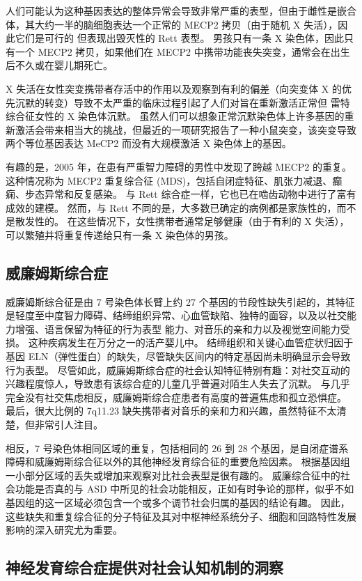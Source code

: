 人们可能认为这种基因表达的整体异常会导致非常严重的表型，但由于雌性是嵌合体，其大约一半的脑细胞表达一个正常的 MECP2 拷贝（由于随机 X 失活），因此它们是可行的 但表现出毁灭性的 Rett 表型。 男孩只有一条 X 染色体，因此只有一个 MECP2 拷贝，如果他们在 MECP2 中携带功能丧失突变，通常会在出生后不久或在婴儿期死亡。

X 失活在女性突变携带者存活中的作用以及观察到有利的偏差（向突变体 X 的优先沉默的转变）导致不太严重的临床过程引起了人们对旨在重新激活正常但 雷特综合征女性的 X 染色体沉默。 虽然人们可以想象正常沉默染色体上许多基因的重新激活会带来相当大的挑战，但最近的一项研究报告了一种小鼠突变，该突变导致两个等位基因表达 MeCP2 而没有大规模激活 X 染色体上的基因。

有趣的是，2005 年，在患有严重智力障碍的男性中发现了跨越 MECP2 的重复。 这种情况称为 MECP2 重复综合征 (MDS)，包括自闭症特征、肌张力减退、癫痫、步态异常和反复感染。 与 Rett 综合症一样，它也已在啮齿动物中进行了富有成效的建模。 然而，与 Rett 不同的是，大多数已确定的病例都是家族性的，而不是散发性的。 在这些情况下，女性携带者通常足够健康（由于有利的 X 失活），可以繁殖并将重复传递给只有一条 X 染色体的男孩。

\subsection{威廉姆斯综合症}
威廉姆斯综合征是由 7 号染色体长臂上约 27 个基因的节段性缺失引起的，其特征是轻度至中度智力障碍、结缔组织异常、心血管缺陷、独特的面容，以及以社交能力增强、语言保留为特征的行为表型 能力、对音乐的亲和力以及视觉空间能力受损。 这种疾病发生在万分之一的活产婴儿中。 结缔组织和关键心血管症状归因于基因 ELN（弹性蛋白）的缺失，尽管缺失区间内的特定基因尚未明确显示会导致行为表型。 尽管如此，威廉姆斯综合症的社会认知特征特别有趣：对社交互动的兴趣程度惊人，导致患有该综合症的儿童几乎普遍对陌生人失去了沉默。 与几乎完全没有社交焦虑相反，威廉姆斯综合症患者有高度的普遍焦虑和孤立恐惧症。 最后，很大比例的 7q11.23 缺失携带者对音乐的亲和力和兴趣，虽然特征不太清楚，但非常引人注目。

相反，7 号染色体相同区域的重复，包括相同的 26 到 28 个基因，是自闭症谱系障碍和威廉姆斯综合征以外的其他神经发育综合征的重要危险因素。 根据基因组一小部分区域的丢失或增加来观察对比社会表型是很有趣的。 威廉综合征中的社会功能是否真的与 ASD 中所见的社会功能相反，正如有时争论的那样，似乎不如基因组的这一区域必须包含一个或多个调节社会归属的基因的结论有趣。 因此，这些缺失和重复综合征的分子特征及其对中枢神经系统分子、细胞和回路特性发展影响的深入研究尤为重要。

\subsection{神经发育综合症提供对社会认知机制的洞察}

